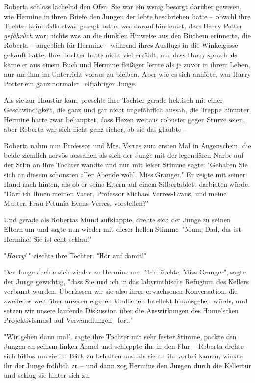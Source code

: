 {Roberta schloss lächelnd den Ofen. Sie war ein wenig besorgt darüber gewesen, wie Hermine in ihren Briefe den Jungen der lebte beschrieben hatte -- obwohl ihre Tochter keinesfalls etwas gesagt hatte, was darauf hindeutet, dass Harry Potter \emph{gefährlich} war; nichts was an die dunklen Hinweise aus den Büchern erinnerte, die Roberta -- angeblich für Hermine -- während ihres Ausflugs in die Winkelgasse gekauft hatte. Ihre Tochter hatte nicht viel erzählt, nur dass Harry sprach als käme er aus einem Buch und Hermine fleißiger lernte als je zuvor in ihrem Leben, nur um ihm im Unterricht voraus zu bleiben. Aber wie es sich anhörte, war Harry Potter ein ganz normaler ~elfjähriger Junge.

Als sie zur Haustür kam, preschte ihre Tochter gerade hektisch mit einer Geschwindigkeit, die ganz und gar nicht ungefährlich aussah, die Treppe hinunter. Hermine hatte zwar behauptet, dass Hexen weitaus robuster gegen Stürze seien, aber Roberta war sich nicht ganz sicher, ob sie das glaubte --

Roberta nahm nun Professor und Mrs. Verres zum ersten Mal in Augenschein, die beide ziemlich nervös aussahen als sich der Junge mit der legendären Narbe auf der Stirn an ihre Tochter wandte und nun mit leiser Stimme sagte: "Gehaben Sie sich an diesem schönsten aller Abende wohl, Miss Granger." Er zeigte mit seiner Hand nach hinten, als ob er seine Eltern auf einem Silbertablett darbieten würde. "Darf ich Ihnen meinen Vater, Professor Michael Verres-Evans, und meine Mutter, Frau Petunia Evans-Verres, vorstellen?"

Und gerade als Robertas Mund aufklappte, drehte sich der Junge zu seinen Eltern um und sagte nun wieder mit dieser hellen Stimme: "Mum, Dad, das ist Hermine! Sie ist echt schlau!"

"\emph{Harry!} " zischte ihre Tochter. "Hör auf damit!"

Der Junge drehte sich wieder zu Hermine um. "Ich fürchte, Miss Granger", sagte der Junge gewichtig, "dass Sie und ich in das labyrinthische Refugium des Kellers verbannt wurden. Überlassen wir sie also ihrer erwachsenen Konversation, die zweifellos weit über unseren eigenen kindlichen Intellekt hinausgehen würde, und setzen wir unsere laufende Diskussion über die Auswirkungen des Hume'schen Projektivismus1 auf Verwandlungen ~fort."

"Wir gehen dann mal", sagte ihre Tochter mit sehr fester Stimme, packte den Jungen an seinem linken Ärmel und schleppte ihn in den Flur -- Roberta drehte sich hilflos um sie im Blick zu behalten und als sie an ihr vorbei kamen, winkte ihr der Junge fröhlich zu -- und dann zog Hermine den Jungen durch die Kellertür und schlug sie hinter sich zu.

}
